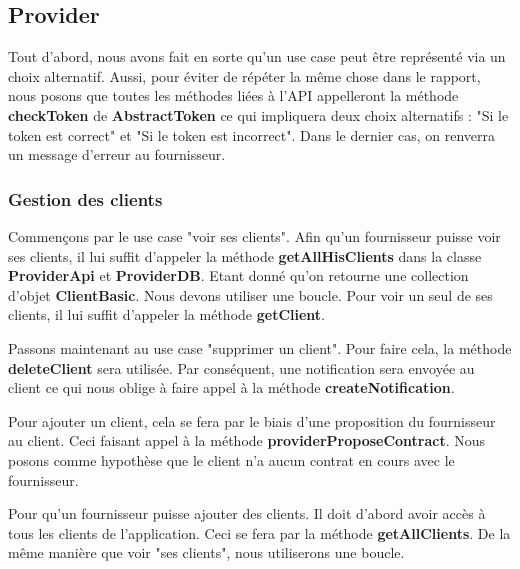 \subsection{Provider}

\begin{flushleft}
Tout d'abord, nous avons fait en sorte qu'un use case peut être représenté via un choix alternatif. Aussi, pour éviter de répéter la même chose dans le rapport, nous posons que toutes les méthodes liées à l'API appelleront la méthode \textbf{checkToken} de \textbf{AbstractToken} ce qui impliquera deux choix alternatifs : "Si le token est correct" et "Si le token est incorrect". Dans le dernier cas, on renverra un message d'erreur au fournisseur.
\end{flushleft}
\subsubsection{Gestion des clients}
\begin{flushleft}
Commençons par le use case "voir ses clients". Afin qu'un fournisseur puisse voir ses clients, il lui suffit d'appeler la méthode \textbf{getAllHisClients} dans la classe \textbf{ProviderApi} et \textbf{ProviderDB}. Etant donné qu'on retourne une collection d'objet \textbf{ClientBasic}. Nous devons utiliser une boucle. Pour voir un seul de ses clients, il lui suffit d'appeler la méthode \textbf{getClient}.
\end{flushleft}

\begin{flushleft}
Passons maintenant au use case "supprimer un client". Pour faire cela, la méthode \textbf{deleteClient} sera utilisée. Par conséquent, une notification sera envoyée au client ce qui nous oblige à faire appel à la méthode \textbf{createNotification}. 
\end{flushleft}

\begin{flushleft}
Pour ajouter un client, cela se fera par le biais d'une proposition du fournisseur au client. Ceci faisant appel à la méthode \textbf{providerProposeContract}. Nous posons comme hypothèse que le client n'a aucun contrat en cours avec le fournisseur. 
\end{flushleft}

\begin{flushleft}
Pour qu'un fournisseur puisse ajouter des clients. Il doit d'abord avoir accès à tous les clients de l'application. Ceci se fera par la méthode \textbf{getAllClients}. De la même manière que voir "ses clients", nous utiliserons une boucle.  
\end{flushleft}

